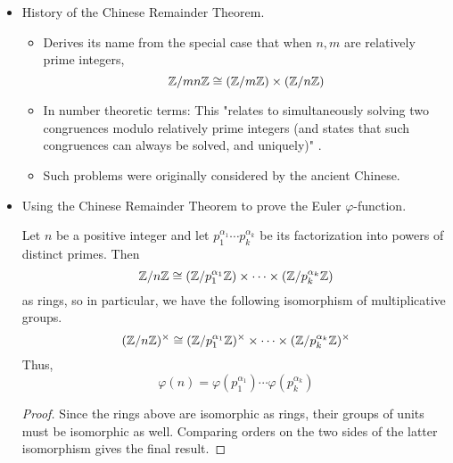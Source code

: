 \documentclass[../notes.tex]{subfiles}
\begin{document}
\begin{itemize}
\begin{theorem}
\begin{proof}
            Given. See HW3 Q3.3.
        \end{proof}
    \end{theorem}
    \item History of the Chinese Remainder Theorem.
    \begin{itemize}
        \item Derives its name from the special case that when $n,m$ are relatively prime integers,
        \begin{equation*}
            \mathbb{Z}/mn\mathbb{Z} \cong (\mathbb{Z}/m\mathbb{Z})\times(\mathbb{Z}/n\mathbb{Z})
        \end{equation*}
        \item In number theoretic terms: This "relates to simultaneously solving two congruences modulo relatively prime integers (and states that such congruences can always be solved, and uniquely)" \parencite[266]{bib:DummitFoote}.
        \item Such problems were originally considered by the ancient Chinese.
    \end{itemize}
    \item Using the Chinese Remainder Theorem to prove the Euler $\varphi$-function.
    \begin{corollary}\label{cly:7.18}
        Let $n$ be a positive integer and let $p_1^{\alpha_1}\cdots p_k^{\alpha_k}$ be its factorization into powers of distinct primes. Then
        \begin{equation*}
            \mathbb{Z}/n\mathbb{Z} \cong (\mathbb{Z}/p_1^{\alpha_1}\mathbb{Z})\times\cdots\times(\mathbb{Z}/p_k^{\alpha_k}\mathbb{Z})
        \end{equation*}
        as rings, so in particular, we have the following isomorphism of multiplicative groups.
        \begin{equation*}
            (\mathbb{Z}/n\mathbb{Z})^\times \cong (\mathbb{Z}/p_1^{\alpha_1}\mathbb{Z})^\times\times\cdots\times(\mathbb{Z}/p_k^{\alpha_k}\mathbb{Z})^\times
        \end{equation*}
        Thus,
        \begin{equation*}
            \varphi(n) = \varphi(p_1^{\alpha_1})\cdots\varphi(p_k^{\alpha_k})
        \end{equation*}
        \begin{proof}
            Since the rings above are isomorphic as rings, their groups of units must be isomorphic as well. Comparing orders on the two sides of the latter isomorphism gives the final result.
        \end{proof}
    \end{corollary}
\end{itemize}
\setcounter{proposition}{0}
\end{document}
